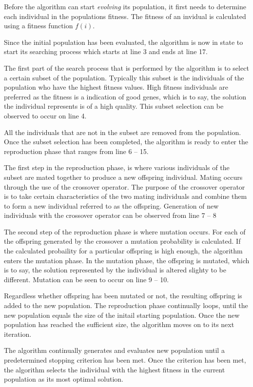 Before the algorithm can start \emph{evolving} its population, it first needs to determine each individual in the populations fitness. The fitness of an invidual is calculated using a fitness function $f(i)$.

Since the initial population has been evaluated, the algorithm is now in state to start its searching process which starts at line 3 and ends at line 17.

The first part of the search process that is performed by the algorithm is to select a certain subset of the population. Typically this subset is the individuals of the population who have the highest fitness values. High fitness individuals are preferred as the fitness is a indication of good genes, which is to say, the solution the individual represents is of a high quality. This subset selection can be observed to occur on line 4.

All the individuals that are not in the subset are removed from the population. Once the subset selection has been completed, the algorithm is ready to enter the reproduction phase that ranges from line 6 -- 15.

The first step in the reproduction phase, is where various individuals of the subset are mated together to produce a new offspring individual. Mating occurs through the use of the crossover operator. The purpose of the crossover operator is to take certain characteristics of the two mating individuals and combine them to form a new individual referred to as the offspring. Generation of new individuals with the crossover operator can be observed from line 7 -- 8

The second step of the reproduction phase is where mutation occurs. For each of the offspring generated by the crossover a mutation probability is calculated. If the calculated probaility for a particular offspring is high enough, the algorithm enters the mutation phase. In the mutation phase, the offspring is mutated, which is to say, the solution represented by the individual is altered slighty to be different. Mutation can be seen to occur on line 9 -- 10.

Regardless whether offspring has been mutated or not, the resulting offspring is added to the new population. The reproduction phase continually loops, until the new population equals the size of the initail starting population. Once the new population has reached the sufficient size, the algorithm moves on to its next iteration.

The algorithm continually generates and evaluates new population until a predetermined stopping criterion has been met. Once the criterion has been met, the algorithm selects the individual with the highest fitness in the current population as its most optimal solution.


